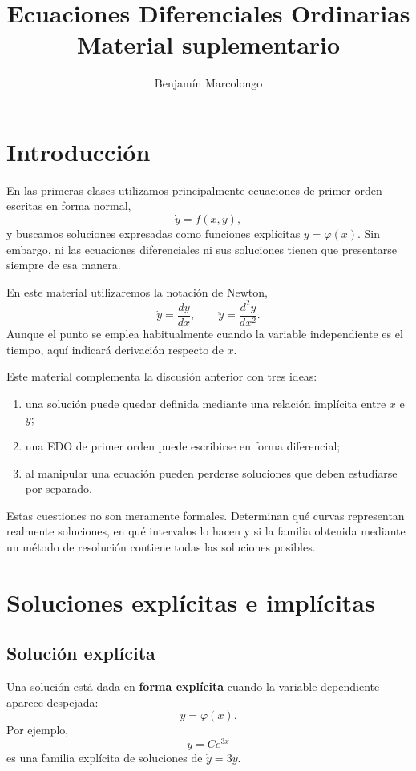 \documentclass[12pt,a4paper]{article}
\title{Ecuaciones Diferenciales Ordinarias\\Material suplementario}
\author{Benjamín Marcolongo}
\date{}
\begin{document}
	\maketitle

	\section{Introducción}

	En las primeras clases utilizamos principalmente ecuaciones de primer orden escritas en forma normal,
	\[
	\dot{y}=f(x,y),
	\]
y buscamos soluciones expresadas como funciones explícitas \(y=\varphi(x)\). Sin embargo, ni las ecuaciones diferenciales ni sus soluciones tienen que presentarse siempre de esa manera.

	En este material utilizaremos la notación de Newton,
	\[
	\dot{y}=\frac{dy}{dx},
	\qquad
	\ddot{y}=\frac{d^2y}{dx^2}.
	\]
Aunque el punto se emplea habitualmente cuando la variable independiente es el tiempo, aquí indicará derivación respecto de $x$.

	Este material complementa la discusión anterior con tres ideas:
	\begin{enumerate}[label=\arabic*.]
		\item una solución puede quedar definida mediante una relación implícita entre \(x\) e \(y\);
		\item una EDO de primer orden puede escribirse en forma diferencial;
		\item al manipular una ecuación pueden perderse soluciones que deben estudiarse por separado.
	\end{enumerate}

	Estas cuestiones no son meramente formales. Determinan qué curvas representan realmente soluciones, en qué intervalos lo hacen y si la familia obtenida mediante un método de resolución contiene todas las soluciones posibles.

	\clearpage
	\section{Soluciones explícitas e implícitas}

	\subsection{Solución explícita}

	Una solución está dada en \textbf{forma explícita} cuando la variable dependiente aparece despejada:
	\[
	y=\varphi(x).
	\]
Por ejemplo,
	\[
	y=Ce^{3x}
	\]
es una familia explícita de soluciones de \(\dot{y}=3y\).
\end{document}
